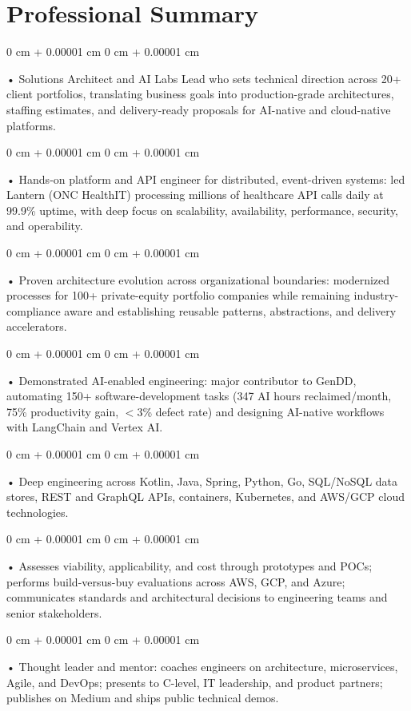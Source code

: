 \documentclass[10pt, letterpaper]{article}
\newenvironment{onecolentry}{
    \begin{adjustwidth}{
        0 cm + 0.00001 cm
    }{
        0 cm + 0.00001 cm
    }
}{
    \end{adjustwidth}
} %
\begin{document}
    \section{Professional Summary}
        \vspace{2 pt }
        \begin{onecolentry}
            • Solutions Architect and AI Labs Lead who sets technical direction across 20+ client portfolios, translating business goals into production-grade architectures, staffing estimates, and delivery-ready proposals for AI-native and cloud-native platforms.
        \end{onecolentry}
        \begin{onecolentry}
            • Hands-on platform and API engineer for distributed, event-driven systems: led Lantern (ONC HealthIT) processing millions of healthcare API calls daily at 99.9\% uptime, with deep focus on scalability, availability, performance, security, and operability.
        \end{onecolentry}
        \begin{onecolentry}
            • Proven architecture evolution across organizational boundaries: modernized processes for 100+ private-equity portfolio companies while remaining industry-compliance aware and establishing reusable patterns, abstractions, and delivery accelerators.
        \end{onecolentry}
        \begin{onecolentry}
            • Demonstrated AI-enabled engineering: major contributor to GenDD, automating 150+ software-development tasks (347 AI hours reclaimed/month, 75\% productivity gain, $<$3\% defect rate) and designing AI-native workflows with LangChain and Vertex AI.
        \end{onecolentry}
        \begin{onecolentry}
            • Deep engineering across Kotlin, Java, Spring, Python, Go, SQL/NoSQL data stores, REST and GraphQL APIs, containers, Kubernetes, and AWS/GCP cloud technologies.
        \end{onecolentry}
        \begin{onecolentry}
            • Assesses viability, applicability, and cost through prototypes and POCs; performs build-versus-buy evaluations across AWS, GCP, and Azure; communicates standards and architectural decisions to engineering teams and senior stakeholders.
        \end{onecolentry}
        \begin{onecolentry}
            • Thought leader and mentor: coaches engineers on architecture, microservices, Agile, and DevOps; presents to C-level, IT leadership, and product partners; publishes on Medium and ships public technical demos.
        \end{onecolentry}
\end{document}
